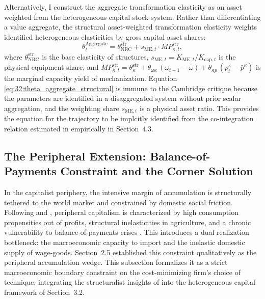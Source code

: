 Alternatively, I construct the aggregate transformation elasticity as an asset weighted from the heterogeneous capital stock system. Rather than differentiating a value aggregate, the structural asset-weighted transformation elasticity weights identified heterogeneous elasticities by gross capital asset shares:
\begin{equation}
	\theta^{\text{Aggregate}}_t = \theta_{\text{NRC}}^{\text{str}} + s_{\text{ME},t} \cdot MP_{\kappa,t}^{\text{str}},
	\label{eq:32:theta_aggregate_structural}
\end{equation}
where $\theta_{\text{NRC}}^{\text{str}}$ is the base elasticity of structures, $s_{\text{ME},t} = K_{\text{ME},t} / K_{\text{cap},t}$ is the physical equipment share, and $MP_{\kappa,t}^{\text{str}} = \theta_{\kappa}^{\text{str}} + \theta_{\omega\kappa}\, (\omega_{t-1} - \bar{\omega}) + \theta_{\kappa p}\, (p^{\kappa}_t - \bar{p}^{\kappa})$ is the marginal capacity yield of mechanization. Equation \eqref{eq:32:theta_aggregate_structural} is immune to the Cambridge critique because the parameters are identified in a disaggregated system without prior scalar aggregation, and the weighting share $s_{\text{ME},t}$ is a physical asset ratio. This provides the equation for the trajectory to be implcitly identified from the co-integration relation estimated in empirically in Section~4.3.




\subsection{The Peripheral Extension: Balance-of-Payments
	Constraint and the Corner Solution}

In the capitalist periphery, the intensive margin of
accumulation is structurally tethered to the world market and
constrained by domestic social friction. Following
\citet{Prebisch1981} and \citet{Kaldor1959}, peripheral
capitalism is characterized by high consumption propensities
out of profits, structural inelasticities in agriculture, and
a chronic vulnerability to balance-of-payments crises
\citep{Ahumada2019}. This introduces a dual realization
bottleneck: the macroeconomic capacity to import and the
inelastic domestic supply of wage-goods. Section~2.5
established this constraint qualitatively as the peripheral
accumulation wedge. This subsection formalizes it as a strict
macroeconomic boundary constraint on the cost-minimizing
firm's choice of technique, integrating the structuralist
insights of \citet{Prebisch1981} into the heterogeneous
capital framework of Section~3.2.

